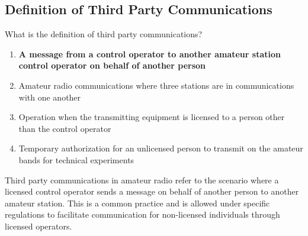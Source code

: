 \subsection{Definition of Third Party Communications}
\label{T1F08}

\begin{tcolorbox}[colback=gray!10!white,colframe=black!75!black,title=T1F08]
What is the definition of third party communications?
\begin{enumerate}[label=\Alph*,noitemsep]
    \item \textbf{A message from a control operator to another amateur station control operator on behalf of another person}
    \item Amateur radio communications where three stations are in communications with one another
    \item Operation when the transmitting equipment is licensed to a person other than the control operator
    \item Temporary authorization for an unlicensed person to transmit on the amateur bands for technical experiments
\end{enumerate}
\end{tcolorbox}

Third party communications in amateur radio refer to the scenario where a licensed control operator sends a message on behalf of another person to another amateur station. This is a common practice and is allowed under specific regulations to facilitate communication for non-licensed individuals through licensed operators.